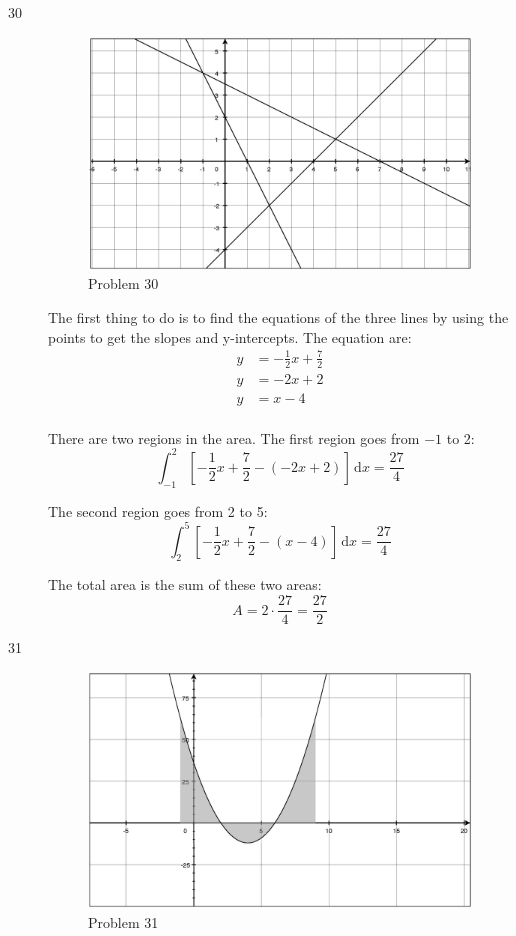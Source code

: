 \documentclass{exam}
\begin{document}
\ifprintanswers
\begin{description}
\item[30]

\begin{figure}[H]
  \centering
  \includegraphics[scale=.3]{problem_30.eps}
  \caption*{Problem 30}
\end{figure}

The first thing to do is to find the equations of the three lines by using the points to get the slopes and
y-intercepts.  The equation are:
\begin{align*}
  y &= -\frac{1}{2} x + \frac{7}{2} \\
  y &= -2x + 2 \\
  y &= x - 4 \\
\end{align*}

There are two regions in the area.  The first region goes from $-1$ to 2:
\[
  \int_{-1}^2 \left[ -\frac{1}{2} x + \frac{7}{2} - (-2x + 2) \right] \, \mathrm{d}x = \frac{27}{4}
\]

The second region goes from 2 to 5:
\[
  \int_2^5 \left[ -\frac{1}{2} x + \frac{7}{2} - (x - 4) \right] \, \mathrm{d}x = \frac{27}{4}
\]

The total area is the sum of these two areas:
\[
  A = 2 \cdot \frac{27}{4} = \frac{27}{2}
\]

\item[31]
\begin{figure}[H]
  \centering
  \includegraphics[scale=.3]{problem_31.eps}
  \caption*{Problem 31}
\end{figure}


\end{description}
\end{document}
